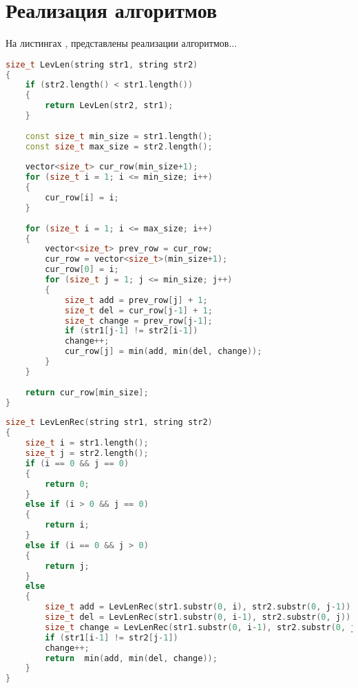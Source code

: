\section{Реализация алгоритмов}
На листингах , представлены реализации алгоритмов...

\begin{lstlisting}[language=c++, caption=Реализация алгоритма Левенштейна обычным способом]
size_t LevLen(string str1, string str2)
{
	if (str2.length() < str1.length())
	{
		return LevLen(str2, str1);
	}
	
	const size_t min_size = str1.length();
	const size_t max_size = str2.length();
	
	vector<size_t> cur_row(min_size+1);
	for (size_t i = 1; i <= min_size; i++)
	{
		cur_row[i] = i;
	}
	
	for (size_t i = 1; i <= max_size; i++)
	{
		vector<size_t> prev_row = cur_row;
		cur_row = vector<size_t>(min_size+1);
		cur_row[0] = i;
		for (size_t j = 1; j <= min_size; j++)
		{
			size_t add = prev_row[j] + 1;
			size_t del = cur_row[j-1] + 1;
			size_t change = prev_row[j-1];
			if (str1[j-1] != str2[i-1])
			change++;
			cur_row[j] = min(add, min(del, change));
		}
	}
	
	return cur_row[min_size];
}
\end{lstlisting}


\begin{lstlisting}[language=c++, caption=Реализация алгоритма Левенштейна рекусрсивным способом]
size_t LevLenRec(string str1, string str2)
{
	size_t i = str1.length();
	size_t j = str2.length();
	if (i == 0 && j == 0)
	{
		return 0;
	}
	else if (i > 0 && j == 0)
	{
		return i;
	}
	else if (i == 0 && j > 0)
	{
		return j;
	}
	else
	{
		size_t add = LevLenRec(str1.substr(0, i), str2.substr(0, j-1)) + 1;
		size_t del = LevLenRec(str1.substr(0, i-1), str2.substr(0, j)) + 1;
		size_t change = LevLenRec(str1.substr(0, i-1), str2.substr(0, j-1));
		if (str1[i-1] != str2[j-1])
		change++;
		return  min(add, min(del, change));
	}
}
\end{lstlisting}

